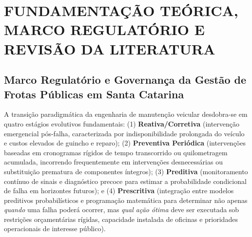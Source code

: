 \chapter{FUNDAMENTAÇÃO TEÓRICA, MARCO REGULATÓRIO E REVISÃO DA LITERATURA}
\label{cap:fundamentacao}

\section{Marco Regulatório e Governança da Gestão de Frotas Públicas em Santa Catarina}

A transição paradigmática da engenharia de manutenção veicular desdobra-se em quatro estágios evolutivos fundamentais:
(1) \textbf{Reativa/Corretiva} (intervenção emergencial pós-falha, caracterizada por indisponibilidade prolongada do veículo e custos elevados de guincho e reparo);
(2) \textbf{Preventiva Periódica} (intervenções baseadas em cronogramas rígidos de tempo transcorrido ou quilometragem acumulada, incorrendo frequentemente em intervenções desnecessárias ou substituição prematura de componentes íntegros);
(3) \textbf{Preditiva} (monitoramento contínuo de sinais e diagnóstico precoce para estimar a probabilidade condicional de falha em horizontes futuros); e
(4) \textbf{Prescritiva} (integração entre modelos preditivos probabilísticos e programação matemática para determinar não apenas \textit{quando} uma falha poderá ocorrer, mas \textit{qual ação ótima} deve ser executada sob restrições orçamentárias rígidas, capacidade instalada de oficinas e prioridades operacionais de interesse público).

